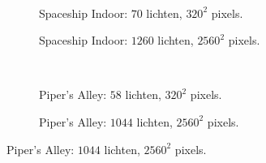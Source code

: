 \begin{figure}[t]
\begin{subfigure}[b]{\textwidth}
  \end{subfigure}\hfill\\
  \begin{adjustbox}{minipage=\textwidth, scale=0.55}
    \begin{subfigure}[b]{0.8\textwidth}
      \centering
      \def\svgwidth{\textwidth}
      
      \caption{Spaceship Indoor: $70$ lichten, $320^2$ pixels.}
      \label{fig:cs-lc-frames-deferred:indoor-low}
    \end{subfigure}
  \end{adjustbox}\hspace{-0.075\textwidth}  %
  \begin{adjustbox}{minipage=\textwidth, scale=0.55}
    \begin{subfigure}[b]{0.8\textwidth}
      \centering
      \def\svgwidth{\textwidth}
      
      \caption{Spaceship Indoor: $1260$ lichten, $2560^2$ pixels.}
      \label{fig:cs-lc-frames-deferred:indoor-high}
    \end{subfigure}
  \end{adjustbox} \\
  \begin{adjustbox}{minipage=\textwidth, scale=0.55}
    \begin{subfigure}[b]{0.8\textwidth}
      \centering
      \def\svgwidth{\textwidth}
      
      \caption{Piper's Alley: $58$ lichten, $320^2$ pixels.}
      \label{fig:cs-lc-frames-deferred:alley-low}
    \end{subfigure}
  \end{adjustbox}\hspace{-0.075\textwidth}  %
  \begin{adjustbox}{minipage=\textwidth, scale=0.55}
    \begin{subfigure}[b]{0.8\textwidth}
      \centering
      \def\svgwidth{\textwidth}
      
      \caption{Piper's Alley: $1044$ lichten, $2560^2$ pixels.}

\end{subfigure}
\end{adjustbox}
\end{figure}
